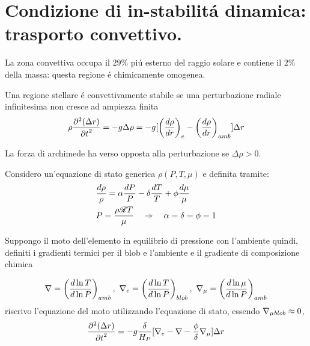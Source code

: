 \documentclass[../main.tex]{subfiles}
\begin{document}


\section{Condizione di in-stabilit\'a dinamica: trasporto convettivo.}

La zona convettiva occupa il $29\%$ pi\'u esterno del raggio solare e contiene il $2\%$ della massa: questa regione \'e chimicamente omogenea. 

Una regione stellare \'e convettivamente stabile se una perturbazione radiale infinitesima non cresce ad ampiezza finita 
\begin{equation}
\rho\PtwoDy{t}{(\Delta r)}=-g\Delta\rho=-g[\Dcvar{\TDy{r}{\rho}}{e}-\Dcvar{\TDy{r}{\rho}}{amb}]\Delta r
\end{equation}

La forza di archimede ha verso opposta alla perturbazione se $\Delta\rho>0$.

Considero un'equazione di stato generica $\rho(P,T,\mu)$ e definita tramite:
\begin{align}
&\frac{d\rho}{\rho}=\alpha\frac{dP}{P}-\delta\frac{dT}{T}+\phi\frac{d\mu}{\mu}\label{eq:deltatherm}\\
&P=\frac{\rho\gasconstant{}T}{\mu}\quad\Rightarrow\quad\alpha=\delta=\phi=1
\end{align}

Suppongo il moto dell'elemento in equilibrio di pressione con l'ambiente quindi, definiti i gradienti termici per il blob e l'ambiente e il gradiente di composizione chimica 

\begin{equation}
\nabla=\Dcvar{\TDly{P}{T}}{amb},\ \nabla_e=\Dcvar{\TDly{P}{T}}{blob},\ \nmu{}=\Dcvar{\TDly{P}{\mu}}{amb}\label{eq:nablavitense}
\end{equation}
riscrivo l'equazione del moto utilizzando l'equazione di stato, essendo $\nmu{}_{blob}\approx0$,
\begin{equation}
\PtwoDy{t}{(\Delta r)}=-g\frac{\delta}{H_P}[\nabla_e-\nabla-\frac{\phi}{\delta}\nmu{}]\Delta r\label{eq:galleggiamento}
\end{equation}
\end{document}
